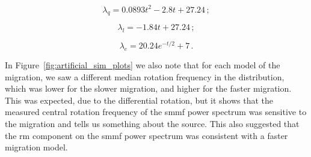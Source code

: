 \begin{equation}
\lambda_{q} = 0.0893t^2 - 2.8t + 27.24 \, ;
\label{eq:quad_lats}
\end{equation}

\begin{equation}
\lambda_{l} = -1.84t + 27.24 \, ;
\label{eq:lin_lats}
\end{equation}

\begin{equation}
\lambda_{e} = 20.24 e^{-t/2} + 7 \, .
\label{eq:exp_lats}
\end{equation}

In Figure~\ref{fig:artificial_sim_plots} we also note that for each model of the migration, we saw a different median rotation frequency in the distribution, which was lower for the slower migration, and higher for the faster migration. This was expected, due to the differential rotation, but it shows that the measured central rotation frequency of the \gls{smmf} power spectrum was sensitive to the migration and tells us something about the source. This also suggested that the \gls{rm} component on the \gls{smmf} power spectrum was consistent with a faster migration model.

